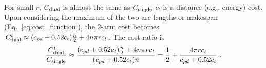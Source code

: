 \noindent For small $r$, $C_{\rm dual}$ is almost the same as $C_{\rm single}$ 
$c_t$ is a distance (e.g., energy) cost. Upon considering the maximum of the two arc lengths or makespan (Eq.~\ref{eq:cost_function}),
the $2$-arm cost becomes $C_{\rm dual}^t \approx (c_{pd} + 0.52c_t)\frac{n}{2} + 4n\pi rc_t$.
The cost ratio is
\vspace{-0.1in}
\begin{equation}\label{eq:makespan-ratio}
\frac{C_{\rm dual}^t}{C_{\rm single}} \approx 
\frac{(c_{pd} + 0.52c_t)\frac{n}{2} + 4n\pi rc_t}{(c_{pd} + 0.52c_t)n}
= \frac{1}{2} + \frac{4\pi rc_t}{c_{pd} + 0.52c_t}\;.
\end{equation}


